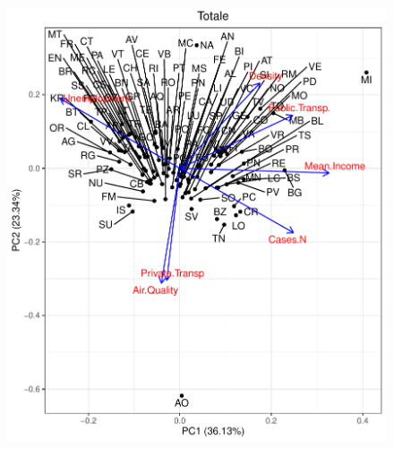 \documentclass[compress]{beamer}
\begin{document}
\begin{frame}
\begin{figure}[H]
\begin{minipage}{.5\textwidth}
  \includegraphics[width=\linewidth,]{Pic/Provinces_PCA_FULL.pdf}
\end{minipage}
\end{figure}

\end{frame}
\end{document}

